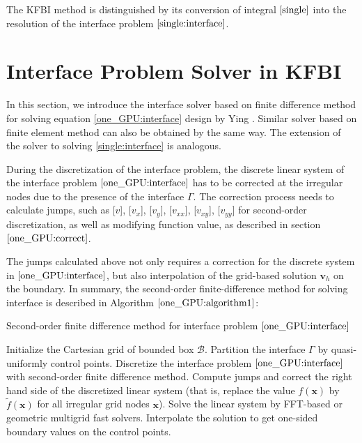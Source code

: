 \documentclass{article}
\begin{document}
The KFBI method is distinguished by its conversion of  integral $\eqref{single}$ into the resolution of the interface problem $\eqref{single:interface}$. 
\iffalse
\section{Interface Problem Solver in KFBI} \label{Interface Problem Solver in KFBI}
In this section, we introduce the interface solver based on finite difference method for solving equation \eqref{one_GPU:interface} design by Ying \cite{ying2007kernel}. Similar solver based on finite element method can also be obtained by the same way. The extension of the solver to solving \eqref{single:interface} is analogous.

During the discretization of the interface problem, the discrete linear system of the interface problem $\eqref{one_GPU:interface}$ has to be corrected at the irregular nodes due to the presence of the interface $\Gamma$. The correction process needs to calculate jumps, such as [$v$], [$v_{x}$], [$v_{y}$], [$v_{xx}$], [$v_{xy}$], [$v_{yy}$] for second-order discretization, as well as modifying function value, as described in section $\ref{one_GPU:correct}$.

The jumps calculated above not only requires a correction for the discrete system in $\eqref{one_GPU:interface}$, but also interpolation of the grid-based solution $\mathbf{v}_{h}$ on the boundary. In summary, the second-order finite-difference method for solving interface is described in Algorithm $\ref{one_GPU:algorithm1}$:
\begin{algorithm}[ht]
\caption{Second-order finite difference method for interface problem $\eqref{one_GPU:interface}$}
\begin{algorithmic}[1]
\State Initialize the Cartesian grid of bounded box $\mathcal{B}$.
\State Partition the interface $\Gamma$ by quasi-uniformly control points.
\State Discretize the interface problem $\eqref{one_GPU:interface}$ with second-order finite difference method.
\State Compute jumps and correct the right hand side of the discretized linear system (that is, replace the value $f(\mathbf{x})$ by $\tilde{f}(\mathbf{x})$ for all irregular grid nodes $\mathbf{x}$).
\State Solve the linear system by FFT-based or geometric multigrid fast solvers.
\State Interpolate the solution to get one-sided boundary values on the control points.
\end{algorithmic} \label{one_GPU:algorithm1}
\end{algorithm}
\end{document}
